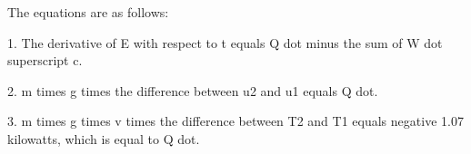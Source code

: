 The equations are as follows:

1. The derivative of E with respect to t equals Q dot minus the sum of W dot superscript c.

2. m times g times the difference between u2 and u1 equals Q dot.

3. m times g times v times the difference between T2 and T1 equals negative 1.07 kilowatts, which is equal to Q dot.